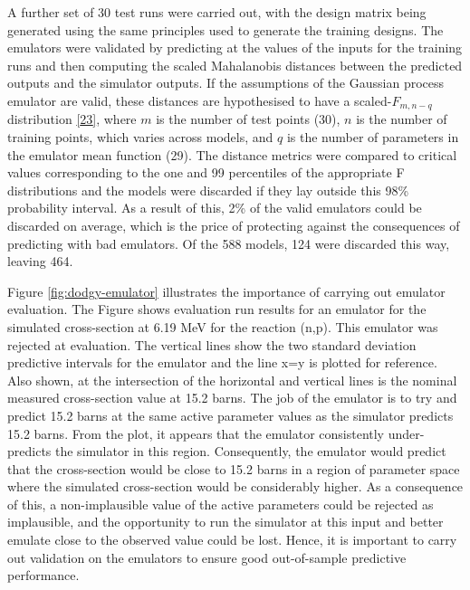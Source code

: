 \documentclass[
  12pt,
  a4paper,
  twoside]{book}
\begin{document}
A further set of 30 test runs were carried out, with the design matrix being generated using the same principles used to generate the training designs. The emulators were validated by predicting at the values of the inputs for the training runs and then computing the scaled Mahalanobis distances between the predicted outputs and the simulator outputs. If the assumptions of the Gaussian process emulator are valid, these distances are hypothesised to have a scaled-\(F_{m,n-q}\) distribution \protect\hyperlink{ref-gp_diagnostics}{{[}23{]}}, where \(m\) is the number of test points (30), \(n\) is the number of training points, which varies across models, and \(q\) is the number of parameters in the emulator mean function (29). The distance metrics were compared to critical values corresponding to the one and 99 percentiles of the appropriate F distributions and the models were discarded if they lay outside this 98\% probability interval. As a result of this, 2\% of the valid emulators could be discarded on average, which is the price of protecting against the consequences of predicting with bad emulators. Of the 588 models, 124 were discarded this way, leaving 464.

Figure \ref{fig:dodgy-emulator} illustrates the importance of carrying out emulator evaluation. The Figure shows evaluation run results for an emulator for the simulated cross-section at 6.19 MeV for the reaction (n,p). This emulator was rejected at evaluation. The vertical lines show the two standard deviation predictive intervals for the emulator and the line x=y is plotted for reference. Also shown, at the intersection of the horizontal and vertical lines is the nominal measured cross-section value at 15.2 barns. The job of the emulator is to try and predict 15.2 barns at the same active parameter values as the simulator predicts 15.2 barns. From the plot, it appears that the emulator consistently under-predicts the simulator in this region. Consequently, the emulator would predict that the cross-section would be close to 15.2 barns in a region of parameter space where the simulated cross-section would be considerably higher. As a consequence of this, a non-implausible value of the active parameters could be rejected as implausible, and the opportunity to run the simulator at this input and better emulate close to the observed value could be lost. Hence, it is important to carry out validation on the emulators to ensure good out-of-sample predictive performance.
\end{document}
